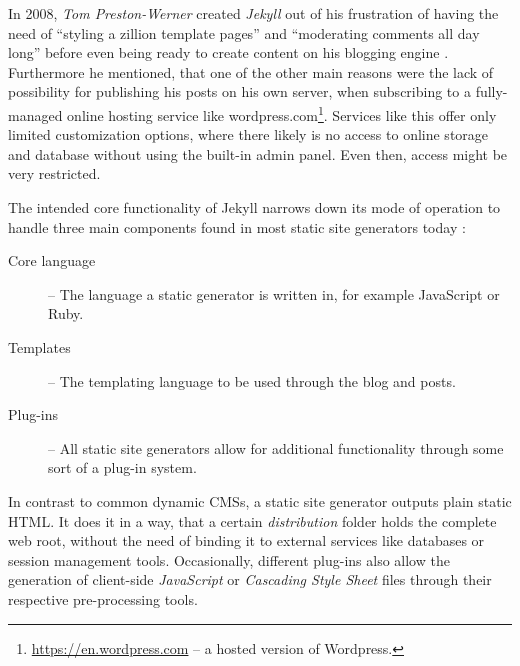 In 2008, \emph{Tom Preston-Werner} created \emph{Jekyll} out of his frustration of having the need of ``styling a zillion template pages'' and ``moderating comments all day long'' before even being ready to create content on his blogging engine \cite[]{PrestonWerner2008jekyll}. Furthermore he mentioned, that one of the other main reasons were the lack of possibility for publishing his posts on his own server, when subscribing to a fully-managed online hosting service like wordpress.com\footnote{\url{https://en.wordpress.com} -- a hosted version of Wordpress.}. Services like this offer only limited customization options, where there likely is no access to online storage and database without using the built-in admin panel. Even then, access might be very restricted.

The intended core functionality of Jekyll narrows down its mode of operation to handle three main components found in most static site generators today \cite[24]{dhillon2016}:

\begin{description}
  \item [Core language] -- The language a static generator is written in, for example JavaScript or Ruby.
  \item [Templates] -- The templating language to be used through the blog and posts.
  \item [Plug-ins] -- All static site generators allow for additional functionality through some
sort of a plug-in system.
\end{description}
In contrast to common dynamic CMSs, a static site generator outputs plain static HTML. It does it in a way, that a certain \emph{distribution} folder holds the complete web root, without the need of binding it to external services like databases or session management tools. Occasionally, different plug-ins also allow the generation of client-side \emph{JavaScript} or \emph{Cascading Style Sheet} files through their respective pre-processing tools.





